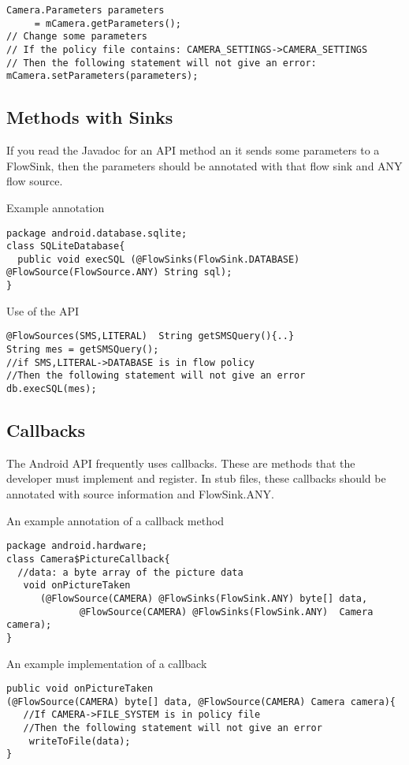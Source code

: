 \begin{Verbatim}
Camera.Parameters parameters
     = mCamera.getParameters();
// Change some parameters
// If the policy file contains: CAMERA_SETTINGS->CAMERA_SETTINGS
// Then the following statement will not give an error:
mCamera.setParameters(parameters);
\end{Verbatim}



\subsection{Methods with Sinks}
If you read the Javadoc for an API method an it sends some parameters to a FlowSink, then the parameters
should be annotated with that flow sink and ANY flow source.  

Example annotation
\begin{Verbatim}
package android.database.sqlite;
class SQLiteDatabase{
  public void execSQL (@FlowSinks(FlowSink.DATABASE) @FlowSource(FlowSource.ANY) String sql);
}
\end{Verbatim}
Use of the API
\begin{Verbatim}
@FlowSources(SMS,LITERAL)  String getSMSQuery(){..}
String mes = getSMSQuery();
//if SMS,LITERAL->DATABASE is in flow policy
//Then the following statement will not give an error
db.execSQL(mes);
\end{Verbatim}

\subsection{Callbacks}
The Android API frequently uses callbacks.  These are methods that the developer must 
implement and register.  In stub files, these callbacks should be annotated
with source information and FlowSink.ANY.  

An example annotation of a callback method
\begin{Verbatim}
package android.hardware;
class Camera$PictureCallback{
  //data: a byte array of the picture data
   void onPictureTaken 
      (@FlowSource(CAMERA) @FlowSinks(FlowSink.ANY) byte[] data, 
             @FlowSource(CAMERA) @FlowSinks(FlowSink.ANY)  Camera camera);
}
\end{Verbatim}

An example implementation of a callback
\begin{Verbatim}
public void onPictureTaken
(@FlowSource(CAMERA) byte[] data, @FlowSource(CAMERA) Camera camera){
   //If CAMERA->FILE_SYSTEM is in policy file
   //Then the following statement will not give an error
    writeToFile(data);
}
\end{Verbatim}


